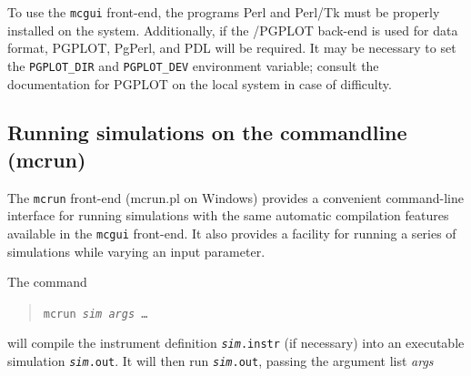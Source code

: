 To use the \verb+mcgui+ front-end, the programs Perl and Perl/Tk must
be properly installed on the system. Additionally, if the \MCS /PGPLOT
back-end is used for data format, PGPLOT, PgPerl, and PDL will be
required.  It may be necessary to set the
\verb+PGPLOT_DIR+ and \verb+PGPLOT_DEV+ environment variable; consult
the documentation for PGPLOT on the local system in case of
difficulty. 

\subsection{Running simulations on the commandline (mcrun)}
\label{s:mcrun}

The \verb+mcrun+ front-end (mcrun.pl on Windows) provides a convenient command-line
interface for running simulations with the same automatic compilation
features available in the \verb+mcgui+ front-end. It also provides a
facility for running a series of simulations while varying an input
parameter.

The command
\begin{quote}
  \texttt{mcrun {\it sim} {\it args\/} \ldots}
\end{quote}
will compile the instrument definition \texttt{{\it sim}.instr} (if
necessary) into an executable simulation \texttt{{\it sim}.out}. It
will then run \texttt{{\it sim}.out}, passing the argument list {\it
  args}

